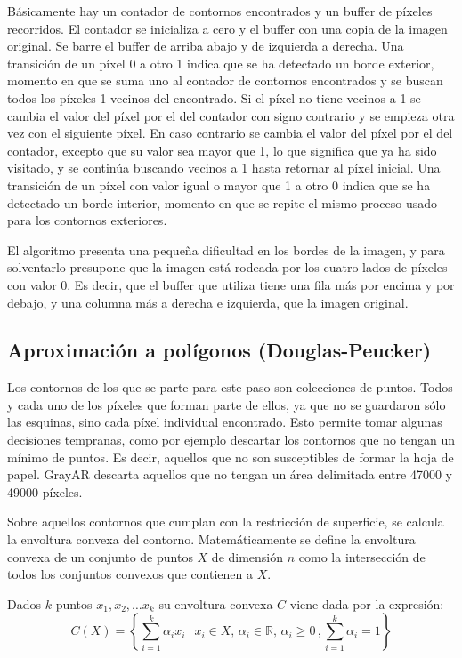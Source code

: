 Básicamente hay un contador de contornos encontrados y un buffer de píxeles recorridos. El contador
se inicializa a cero y el buffer con una copia de la imagen original. Se barre el buffer de arriba
abajo y de izquierda a derecha. Una transición de un píxel 0 a otro 1 indica que se ha detectado un
borde exterior, momento en que se suma uno al contador de contornos encontrados y se buscan todos
los píxeles 1 vecinos del encontrado. Si el píxel no tiene vecinos a 1 se cambia el valor del píxel
por el del contador con signo contrario y se empieza otra vez con el siguiente píxel. En caso
contrario se cambia el valor del píxel por el del contador, excepto que su valor sea mayor que 1, lo
que significa que ya ha sido visitado, y se continúa buscando vecinos a 1 hasta retornar al píxel
inicial. Una transición de un píxel con valor igual o mayor que 1 a otro 0 indica que se ha
detectado un borde interior, momento en que se repite el mismo proceso usado para los contornos
exteriores.

El algoritmo presenta una pequeña dificultad en los bordes de la imagen, y para solventarlo
presupone que la imagen está rodeada por los cuatro lados de píxeles con valor 0. Es decir, que el
buffer que utiliza tiene una fila más por encima y por debajo, y una columna más a derecha e
izquierda, que la imagen original.



\subsection{Aproximación a polígonos (Douglas-Peucker)}
Los contornos de los que se parte para este paso son colecciones de puntos. Todos y cada uno de los
píxeles que forman parte de ellos, ya que no se guardaron sólo las esquinas, sino cada píxel
individual encontrado. Esto permite tomar algunas decisiones tempranas, como por ejemplo descartar
los contornos que no tengan un mínimo de puntos. Es decir, aquellos que no son susceptibles de formar
la hoja de papel. GrayAR descarta aquellos que no tengan un área delimitada entre 47000 y 49000
píxeles.

Sobre aquellos contornos que cumplan con la restricción de superficie, se calcula la envoltura
convexa del contorno. Matemáticamente se define la envoltura convexa de un conjunto de puntos $X$ de
dimensión $n$ como la intersección de todos los conjuntos convexos que contienen a $X$.

Dados $k$ puntos $x_1, x_2,\dots x_k$ su envoltura convexa $C$ viene dada por la expresión:
\begin{equation}
C(X) =\left\{\sum_{i=1}^k \alpha_i x_i \ \Bigg | \ x_i\in X, \, \alpha_i\in \mathbb{R}, \, \alpha_i \geq 0 \, , \sum_{i=1}^k \alpha_i=1\right\}
\end{equation}

